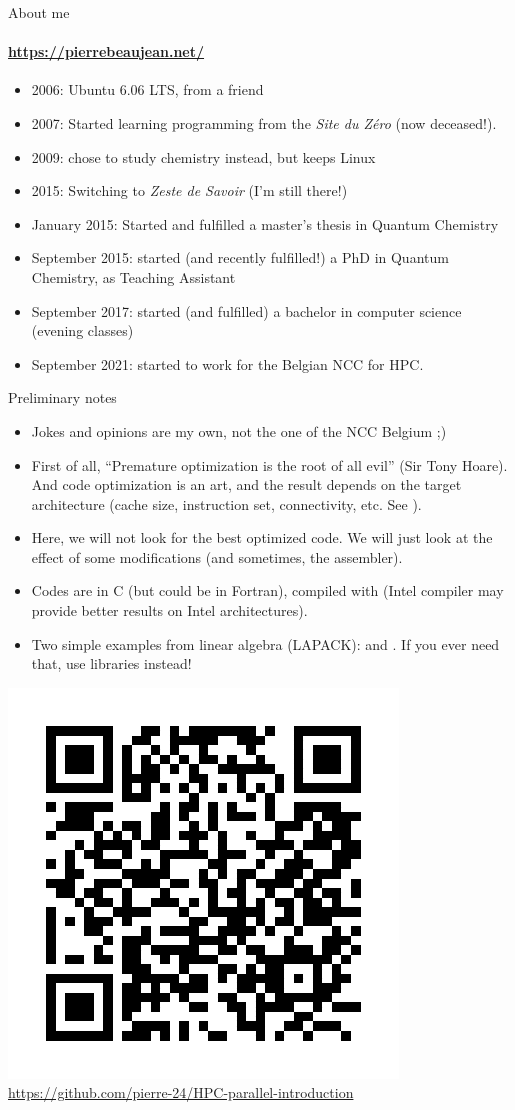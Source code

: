 \begin{frame}{About me}
	\framesubtitle{
		\url{https://pierrebeaujean.net/}}
	\begin{itemize}
		\item 2006: Ubuntu 6.06 LTS, from a friend
		\item 2007: Started learning programming from the \textit{Site du Zéro} (now deceased!).
		\item 2009: chose to study chemistry instead, but keeps Linux
		\item 2015: Switching to \textit{Zeste de Savoir} (I'm still there!)
		\item January 2015: Started and fulfilled a master’s thesis in Quantum Chemistry
		\item September 2015: started (and recently fulfilled!) a PhD in Quantum Chemistry, as Teaching Assistant
		\item September 2017: started (and fulfilled) a bachelor in computer science (evening classes)
		\item September 2021: started to work for the Belgian NCC for HPC.
	\end{itemize}
	
\end{frame}

\begin{frame}{Preliminary notes}
	\begin{itemize}
		\item Jokes and opinions are my own, not the one of the NCC Belgium ;)
		\item First of all, ``Premature optimization is the root of all evil'' (Sir Tony Hoare). And code optimization is an art, and the result depends on the target architecture (cache size, instruction set, connectivity, etc. See ).
		\item Here, we will not look for the best optimized code. We will just look at the effect of some modifications (and sometimes, the assembler).
		\item Codes are in C (but could be in Fortran), compiled with  (Intel compiler may provide better results on Intel architectures). 
		\item Two simple examples from linear algebra (LAPACK):  and . If you ever need that, use libraries instead!
	\end{itemize}
\begin{center}
	\includegraphics[width=.25\textwidth]{qrcode}\\
	\url{https://github.com/pierre-24/HPC-parallel-introduction}
\end{center}
\end{frame}

